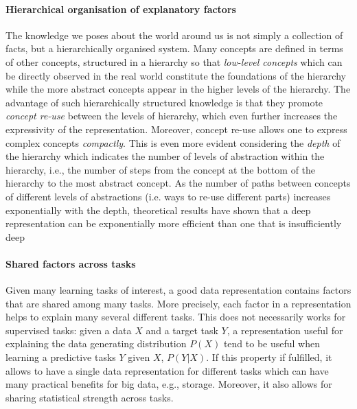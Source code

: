 \paragraph{\textbf{Hierarchical organisation of explanatory factors}}
The knowledge we poses about the world around us is not simply a collection of facts, but a hierarchically organised system.
Many concepts are defined in terms of other concepts, structured in a hierarchy so that \textit{low-level concepts} which can be directly observed in the real world constitute the foundations of the hierarchy while the more abstract concepts appear in the higher levels of the hierarchy.
The advantage of such hierarchically structured knowledge is that they promote \textit{concept re-use} between the levels of hierarchy, which even further increases the expressivity of the representation.
Moreover, concept re-use allows one to express complex concepts \textit{compactly}.
This is even more evident considering the \textit{depth} of the hierarchy which indicates the number of levels of abstraction within the hierarchy, i.e., the number of steps from the concept at the bottom of the hierarchy to the most abstract concept.
As the number of paths between concepts of different levels of abstractions (i.e. ways to re-use different parts) increases exponentially with the depth, theoretical results have shown that a deep representation can be exponentially more efficient than one that is insufficiently deep \cite{Hastad:1986:AOL:12130.12132,89582,Bengio:2011:EPD:2050345.2050349}





\paragraph{\textbf{Shared factors across tasks}}
Given many learning tasks of interest, a good data representation contains factors that are shared among many tasks.
More precisely, each factor in a representation helps to explain many several different tasks.
This does not necessarily works for supervised tasks: given a data $X$ and a target task $Y$, a representation useful for explaining the data generating distribution $P(X)$ tend to be useful when learning a predictive tasks $Y$ given $X$, $P(Y|X)$.
If this property if fulfilled, it allows to have a single data representation for different tasks which can have many practical benefits for big data, e.g., storage.
Moreover, it also allows for sharing statistical strength across tasks.




